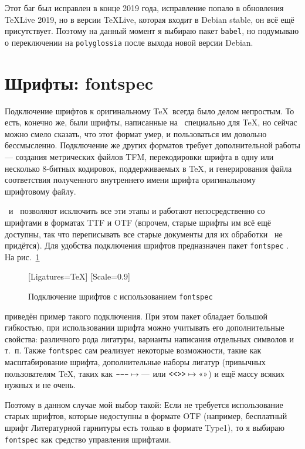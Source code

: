 \documentclass[a4paper,12pt,hyphens]{article}
\newcommand\package[1]{\texttt{#1}}
\begin{document}
Этот баг был исправлен в конце 2019 года, исправление попало в обновления
TeXLive 2019, но в версии TeXLive, которая входит в Debian stable, он всё ещё
присутствует.
Поэтому на данный момент я выбираю пакет \package{babel}, но подумываю о переключении
на \package{polyglossia} после выхода новой версии Debian.

\section{Шрифты: fontspec}
Подключение шрифтов к оригинальному \TeX\ всегда было делом непростым.
То есть, конечно же, были шрифты, написанные на \METAFONT\ специально для
\TeX, но сейчас можно смело сказать, что этот формат умер, и пользоваться
им довольно бессмысленно. Подключение же других форматов требует
дополнительной работы --- создания метрических файлов TFM, перекодировки
шрифта в одну или несколько 8-битных кодировок, поддерживаемых в \TeX,
и генерирования файла соответствия полученного внутреннего имени шрифта
оригинальному шрифтовому файлу.

\XeTeX\ и \LuaTeX\ позволяют исключить все эти этапы и работают
непосредственно со шрифтами в форматах TTF и OTF (впрочем, старые
шрифты им всё ещё доступны, так что переписывать все старые документы для
их обработки \LuaLaTeX\ не придётся). Для удобства подключения шрифтов
предназначен пакет \package{fontspec} \parencite{ctan-fontspec}.
На рис.~\ref{fontspec1}
\begin{figure}[tp]
\begin{latexcode}
\usepackage{fontspec}
\setmainfont{STIX Two Text}[Ligatures=TeX]
\setmonofont{PT Mono}[Scale=0.9]
\end{latexcode}
\caption{Подключение шрифтов с использованием
\package{fontspec}}\label{fontspec1}
\end{figure}
приведён пример такого подключения. При этом пакет обладает большой
гибкостью, при использовании шрифта можно учитывать его дополнительные
свойства: различного рода лигатуры, варианты написания отдельных
символов и т.~п. Также \package{fontspec} сам реализует некоторые
возможности, такие как масштабирование шрифта, дополнительные наборы
лигатур (привычных пользователям \TeX, таких как
$\verb|---|\mapsto\text{---}$ или $\verb|<<>>|\mapsto\text{<<>>}$)
и ещё массу всяких нужных и не очень.

Поэтому в данном случае мой выбор такой: Если не требуется использование
старых шрифтов, которые недоступны в формате OTF (например, бесплатный
шрифт Литературной гарнитуры есть только в формате Type1), то я выбираю
\package{fontspec} как средство управления шрифтами.
\end{document}
